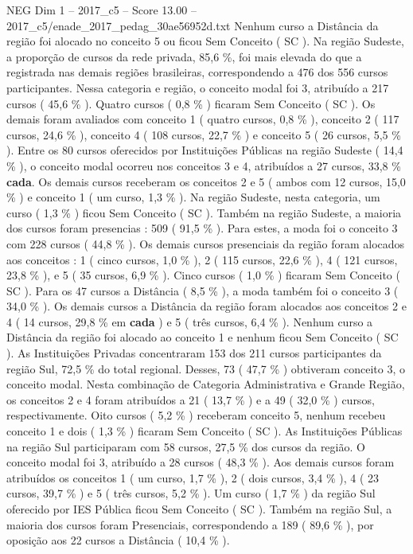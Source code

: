 \begin{textsample}{NEG Dim 1 – 2017\_c5 – Score 13.00 – 2017\_c5/enade\_2017\_pedag\_30ae56952d.txt}
Nenhum curso a Distância da região foi alocado no conceito 5 ou ficou Sem Conceito ( SC ).
Na região Sudeste, a proporção de cursos da rede privada, 85,6 \%, foi mais elevada do que a registrada nas demais regiões brasileiras, correspondendo a 476 dos 556 cursos participantes.
Nessa categoria e região, o conceito modal foi 3, atribuído a 217 cursos ( 45,6 \% ).
Quatro cursos ( 0,8 \% ) ficaram Sem Conceito ( SC ).
Os demais foram avaliados com conceito 1 ( quatro cursos, 0,8 \% ), conceito 2 ( 117 cursos, 24,6 \% ), conceito 4 ( 108 cursos, 22,7 \% ) e conceito 5 ( 26 cursos, 5,5 \% ).
Entre os 80 cursos oferecidos por Instituições Públicas na região Sudeste ( 14,4 \% ), o conceito modal ocorreu nos conceitos 3 e 4, atribuídos a 27 cursos, 33,8 \% \textbf{cada}.
Os demais cursos receberam os conceitos 2 e 5 ( ambos com 12 cursos, 15,0 \% ) e conceito 1 ( um curso, 1,3 \% ).
Na região Sudeste, nesta categoria, um curso ( 1,3 \% ) ficou Sem Conceito ( SC ).
Também na região Sudeste, a maioria dos cursos foram presencias : 509 ( 91,5 \% ).
Para estes, a moda foi o conceito 3 com 228 cursos ( 44,8 \% ).
Os demais cursos presenciais da região foram alocados aos conceitos : 1 ( cinco cursos, 1,0 \% ), 2 ( 115 cursos, 22,6 \% ), 4 ( 121 cursos, 23,8 \% ), e 5 ( 35 cursos, 6,9 \% ).
Cinco cursos ( 1,0 \% ) ficaram Sem Conceito ( SC ).
Para os 47 cursos a Distância ( 8,5 \% ), a moda também foi o conceito 3 ( 34,0 \% ).
Os demais cursos a Distância da região foram alocados aos conceitos 2 e 4 ( 14 cursos, 29,8 \% em \textbf{cada} ) e 5 ( três cursos, 6,4 \% ).
Nenhum curso a Distância da região foi alocado ao conceito 1 e nenhum ficou Sem Conceito ( SC ).
As Instituições Privadas concentraram 153 dos 211 cursos participantes da região Sul, 72,5 \% do total regional.
Desses, 73 ( 47,7 \% ) obtiveram conceito 3, o conceito modal.
Nesta combinação de Categoria Administrativa e Grande Região, os conceitos 2 e 4 foram atribuídos a 21 ( 13,7 \% ) e a 49 ( 32,0 \% ) cursos, respectivamente.
Oito cursos ( 5,2 \% ) receberam conceito 5, nenhum recebeu conceito 1 e dois ( 1,3 \% ) ficaram Sem Conceito ( SC ).
As Instituições Públicas na região Sul participaram com 58 cursos, 27,5 \% dos cursos da região.
O conceito modal foi 3, atribuído a 28 cursos ( 48,3 \% ).
Aos demais cursos foram atribuídos os conceitos 1 ( um curso, 1,7 \% ), 2 ( dois cursos, 3,4 \% ), 4 ( 23 cursos, 39,7 \% ) e 5 ( três cursos, 5,2 \% ).
Um curso ( 1,7 \% ) da região Sul oferecido por IES Pública ficou Sem Conceito ( SC ).
Também na região Sul, a maioria dos cursos foram Presenciais, correspondendo a 189 ( 89,6 \% ), por oposição aos 22 cursos a Distância ( 10,4 \% ).

\end{textsample}
